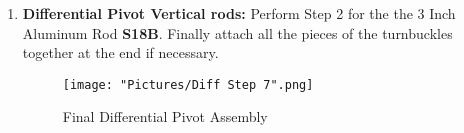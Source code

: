 \documentclass[12pt]{article}
\begin{document}
\begin{enumerate}
\item \textbf{Differential Pivot Vertical rods:} Perform Step 2 for the the 3 Inch Aluminum Rod \textbf{S18B}. Finally attach all the pieces of the turnbuckles together at the end if necessary. 

\begin{figure}[H]
\centering	
  \texttt{[image: "Pictures/Diff Step 7".png]}
	\caption{Final Differential Pivot Assembly}
	\label{diff pivot rod}
\end{figure}


\end{enumerate}
\end{document}
